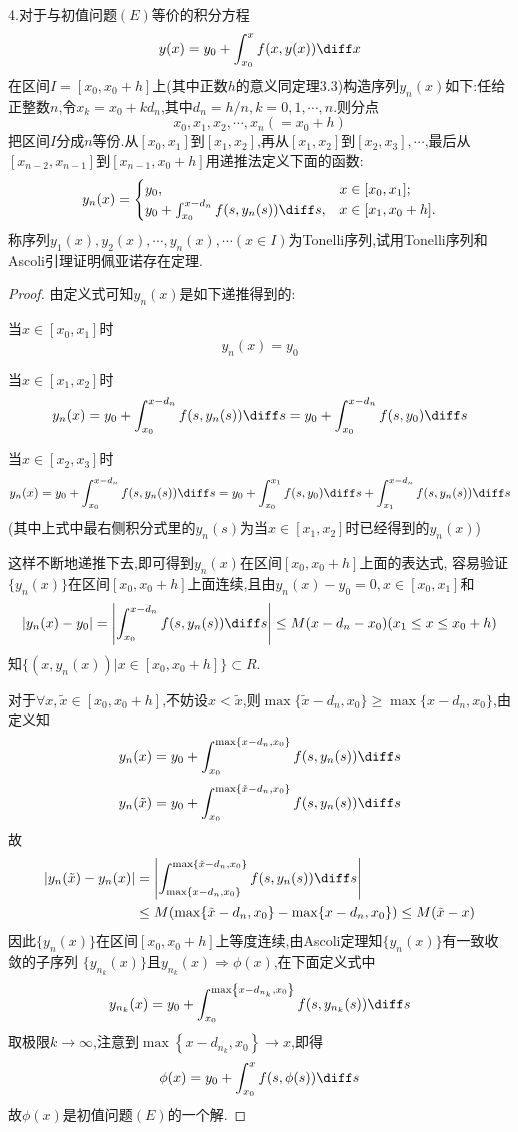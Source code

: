 4.对于与初值问题$(E)$等价的积分方程
\[y(x)=y_0+\int_{x_0}^xf(x,y(x))\diff x\]
在区间$I=[x_0,x_0+h]$上(其中正数$h$的意义同定理3.3)构造序列$y_n(x)$如下:任给正整数$n$,令$x_k=x_0+kd_n$,其中$d_n=h/n,k=0,1,\cdots,n$.则分点
\[x_0,x_1,x_2,\cdots,x_n(=x_0+h)\]
把区间$I$分成$n$等份.从$[x_0,x_1]$到$[x_1,x_2]$,再从$[x_1,x_2]$到$[x_2,x_3],\cdots$,最后从$[x_{n-2},x_{n-1}]$到$[x_{n-1},x_0+h]$用递推法定义下面的函数:
\[y_n(x)=\begin{cases}
y_0,&x\in[x_0,x_1];\\
y_0+\int_{x_0}^{x-d_n}f(s,y_n(s))\diff s,&x\in[x_1,x_0+h].
\end{cases}\]
称序列$y_1(x),y_2(x),\cdots,y_n(x),\cdots(x\in I)$为Tonelli序列,试用Tonelli序列和Ascoli引理证明佩亚诺存在定理.

\begin{proof}
由定义式可知$y_n(x)$是如下递推得到的:

当$x\in[x_0,x_1]$时
\[y_n(x)=y_0\]

当$x\in[x_1,x_2]$时
\[y_n(x)=y_0+\int_{x_0}^{x-d_n}f(s,y_n(s))\diff s=y_0+\int_{x_0}^{x-d_n}f(s,y_0)\diff s\]

当$x\in[x_2,x_3]$时
\[y_n(x)=y_0+\int_{x_0}^{x-d_n}f(s,y_n(s))\diff s=y_0+\int_{x_0}^{x_1}f(s,y_0)\diff s+\int_{x_1}^{x-d_n}f(s,y_n(s))\diff s\]
(其中上式中最右侧积分式里的$y_n(s)$为当$x\in[x_1,x_2]$时已经得到的$y_n(x)$)

这样不断地递推下去,即可得到$y_n(x)$在区间$[x_0,x_0+h]$上面的表达式,
容易验证$\{y_n(x)\}$在区间$[x_0,x_0+h]$上面连续,且由$y_n(x)-y_0=0,x\in[x_0,x_1]$和
\[|y_n(x)-y_0|=\left|\int_{x_0}^{x-d_n}f(s,y_n(s))\diff s\right|\leq M(x-d_n-x_0)(x_1\leq x\leq x_0+h)\]
知$\{(x,y_n(x))|x\in[x_0,x_0+h]\}\subset R$.

对于$\forall x,\tilde{x}\in[x_0,x_0+h]$,不妨设$x<\tilde{x}$,则$\max\{\tilde{x}-d_n,x_0\}\geq\max\{x-d_n,x_0\}$,由定义知
\[y_n(x)=y_0+\int_{x_0}^{\max\{x-d_n,x_0\}}f(s,y_n(s))\diff s\]
\[y_n(\tilde{x})=y_0+\int_{x_0}^{\max\{\tilde{x}-d_n,x_0\}}f(s,y_n(s))\diff s\]
故
\[\begin{split}|y_n(\tilde{x})-y_n(x)|&=\left|\int_{\max\{x-d_n,x_0\}}^{\max\{\tilde{x}-d_n,x_0\}}f(s,y_n(s))\diff s\right|\\
&\leq M(\max\{\tilde{x}-d_n,x_0\}-\max\{x-d_n,x_0\})\leq M(\tilde{x}-x)
\end{split}\]
因此$\{y_n(x)\}$在区间$[x_0,x_0+h]$上等度连续,由Ascoli定理知$\{y_n(x)\}$有一致收敛的子序列
$\{y_{n_k}(x)\}$且$y_{n_k}(x)\Rightarrow\phi(x)$,在下面定义式中
\[y_{n_k}(x)=y_0+\int_{x_0}^{\max\left\{x-d_{n_k},x_0\right\}}f(s,y_{n_k}(s))\diff s\]
取极限$k\to\infty$,注意到$\max\left\{x-d_{n_k},x_0\right\}\to x$,即得
\[\phi(x)=y_0+\int_{x_0}^xf(s,\phi(s))\diff s\]
故$\phi(x)$是初值问题$(E)$的一个解.
\end{proof}


